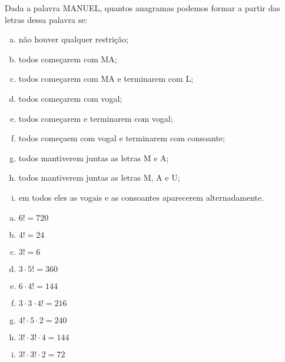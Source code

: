 \begin{ex}
 Dada a palavra MANUEL, quantos anagramas podemos formar a partir das letras dessa palavra se:
    \begin{enumerate}[(a)]
    \item não houver qualquer restrição;
    \item todos começarem com MA;
    \item todos começarem com MA e terminarem com L;
    \item todos começarem com vogal;
    \item todos começarem e terminarem com vogal;
    \item todos começaem com vogal e terminarem com consoante;
    \item todos mantiverem juntas as letras M e A;
    \item todos mantiverem juntas as letras M, A e U;
    \item em todos eles as vogais e as consoantes aparecerem alternadamente.
    \end{enumerate}
      \begin{sol}
       \phantom{A}
         \begin{enumerate} [(a)]
             \item $6!=720$
             \item $4!=24$
             \item $3!=6$
             \item $3\cdot5!=360$
             \item $6\cdot4!=144$
             \item $3\cdot3\cdot4!=216$
             \item $4!\cdot5\cdot2=240$
             \item $3!\cdot3!\cdot4=144$
             \item $3!\cdot3!\cdot2=72$
         \end{enumerate}
      \end{sol}
\end{ex}